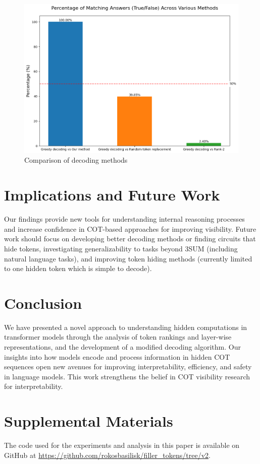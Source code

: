 \documentclass{article}
\begin{document}
\begin{figure}[H]
\centering
\includegraphics[width=\textwidth]{token_comparison_percentages.png}
\caption{Comparison of decoding methods}
\label{fig:decoding_comparison}
\end{figure}

\section{Implications and Future Work}
Our findings provide new tools for understanding internal reasoning processes and increase confidence in COT-based approaches for improving visibility. Future work should focus on developing better decoding methods or finding circuits that hide tokens, investigating generalizability to tasks beyond 3SUM (including natural language tasks), and improving token hiding methods (currently limited to one hidden token which is simple to decode).

\section{Conclusion}
We have presented a novel approach to understanding hidden computations in transformer models through the analysis of token rankings and layer-wise representations, and the development of a modified decoding algorithm. Our insights into how models encode and process information in hidden COT sequences open new avenues for improving interpretability, efficiency, and safety in language models. This work strengthens the belief in COT visibility research for interpretability.

\section*{Supplemental Materials}
The code used for the experiments and analysis in this paper is available on GitHub at \url{https://github.com/rokosbasilisk/filler_tokens/tree/v2}.
\end{document}
